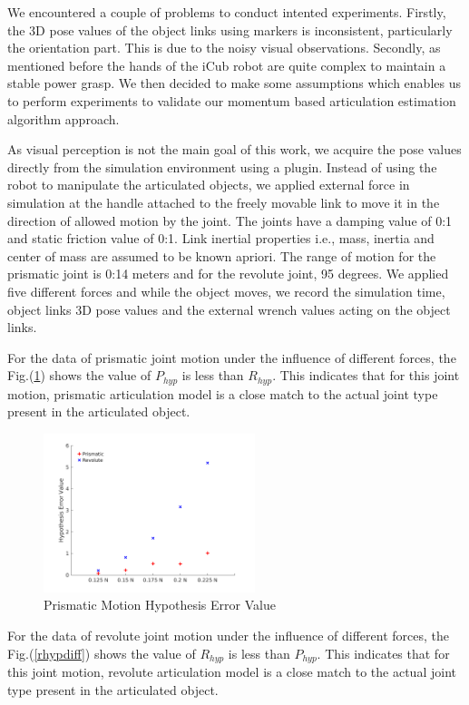 \documentclass[12pt,a4paper]{report}
\begin{document}
We encountered a couple of problems to conduct intented experiments. Firstly, the 3D pose values of the object links using markers is inconsistent, particularly the orientation part. This is due to the noisy visual observations. Secondly, as mentioned before the hands of the iCub robot are quite complex to maintain a stable power grasp. We then decided to make some assumptions which enables us to perform experiments to validate our momentum based articulation estimation algorithm approach. 

As visual perception is not the main goal of this work, we acquire the pose values directly from the simulation environment using a plugin. Instead of using the robot to manipulate the articulated objects, we applied external force in simulation at the handle attached to the freely movable link to move it in the direction of allowed motion by the joint. The joints have a damping value of 0:1 and static friction value of 0:1. Link inertial properties i.e., mass, inertia and center of mass are assumed to be known apriori. The range of motion for the prismatic joint is 0:14 meters and for the revolute joint, 95 degrees. We applied five different forces and while the object moves, we record the simulation time, object links 3D pose values and the external wrench values acting on the object links. 

For the data of prismatic joint motion under the influence of different forces, the Fig.(\ref{phypdiff}) shows the value of $P_{hyp}$ is less than $R_{hyp}$. This indicates that for this joint motion, prismatic articulation model is a close match to the actual joint type present in the articulated object.

\begin{figure}[H]
  \centering
  \includegraphics[width=0.55\textwidth]{figures/phypdiff.png}
  \caption{Prismatic Motion Hypothesis Error Value}
  \label{phypdiff}
\end{figure}

For the data of revolute joint motion under the influence of different forces, the Fig.(\ref{rhypdiff}) shows the value of $R_{hyp}$ is less than $P_{hyp}$. This indicates that for this joint motion, revolute articulation model is a close match to the actual joint type present in the articulated object.
\end{document}
